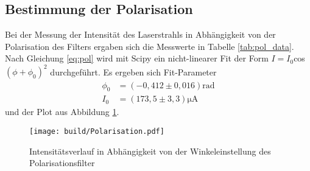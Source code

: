 \subsection{Bestimmung der Polarisation}
Bei der Messung der Intensität des Laserstrahls in Abhängigkeit von der Polarisation des Filters ergaben sich die
Messwerte in Tabelle \ref{tab:pol_data}.
Nach Gleichung \ref{eq:pol} wird mit Scipy \cite{scipy} ein nicht-linearer Fit der Form $I = I_0$cos$(\phi+\phi_0)^2$ durchgeführt.
Es ergeben sich Fit-Parameter
\begin{align}
  \phi_0&=(-0,412\pm 0,016)\si{\radian}\nonumber\\
  I_0&=(173,5\pm 3,3)\si{\micro\ampere}\label{eqn:Parameter_Polarisation}
\end{align}
und der Plot aus Abbildung \ref{fig:Polarisation}.
\begin{figure}
  \centering
  \texttt{[image: build/Polarisation.pdf]}
  \caption{Intensitätsverlauf in Abhängigkeit von der Winkeleinstellung des Polarisationsfilter}
  \label{fig:Polarisation}
\end{figure}


